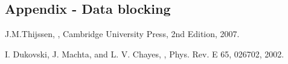 \documentclass[twoside]{article}
\begin{document}
\begin{multicols}{2}
\begin{appendices}
\section{Appendix - Data blocking}

\end{appendices}


\begin{thebibliography}{99} %

J.M.Thijssen,
, Cambridge University Press, 2nd Edition, 2007.

I. Dukovski, J. Machta, and L. V. Chayes, 
, Phys. Rev. E 65, 026702, 2002.


\end{thebibliography}

\end{multicols}
\end{document}
